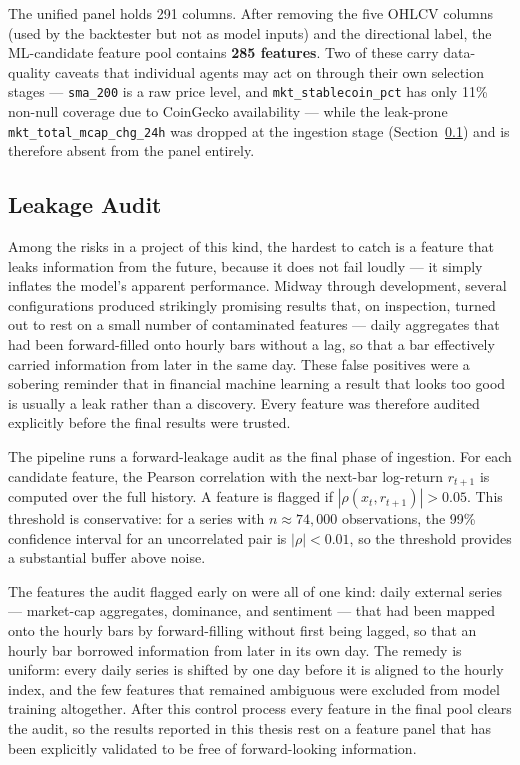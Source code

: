 The unified panel holds 291 columns. After removing the five OHLCV columns (used by the backtester but not as model inputs) and the directional label, the ML-candidate feature pool contains \textbf{285 features}. Two of these carry data-quality caveats that individual agents may act on through their own selection stages --- \texttt{sma\_200} is a raw price level, and \texttt{mkt\_stablecoin\_pct} has only 11\% non-null coverage due to CoinGecko availability --- while the leak-prone \texttt{mkt\_total\_mcap\_chg\_24h} was dropped at the ingestion stage (Section~\ref{sec:leakage_audit}) and is therefore absent from the panel entirely.

\subsection{Leakage Audit}
\label{sec:leakage_audit}

Among the risks in a project of this kind, the hardest to catch is a feature that leaks information from the future, because it does not fail loudly --- it simply inflates the model's apparent performance. Midway through development, several configurations produced strikingly promising results that, on inspection, turned out to rest on a small number of contaminated features --- daily aggregates that had been forward-filled onto hourly bars without a lag, so that a bar effectively carried information from later in the same day. These false positives were a sobering reminder that in financial machine learning a result that looks too good is usually a leak rather than a discovery. Every feature was therefore audited explicitly before the final results were trusted.


The pipeline runs a forward-leakage audit as the final phase of ingestion. For each candidate feature, the Pearson correlation with the next-bar log-return $r_{t+1}$ is computed over the full history. A feature is flagged if $|\rho(x_t, r_{t+1})| > 0.05$. This threshold is conservative: for a series with $n \approx 74{,}000$ observations, the 99\% confidence interval for an uncorrelated pair is $|\rho| < 0.01$, so the threshold provides a substantial buffer above noise.


The features the audit flagged early on were all of one kind: daily external series --- market-cap aggregates, dominance, and sentiment --- that had been mapped onto the hourly bars by forward-filling without first being lagged, so that an hourly bar borrowed information from later in its own day. The remedy is uniform: every daily series is shifted by one day before it is aligned to the hourly index, and the few features that remained ambiguous were excluded from model training altogether. After this control process every feature in the final pool clears the audit, so the results reported in this thesis rest on a feature panel that has been explicitly validated to be free of forward-looking information.


